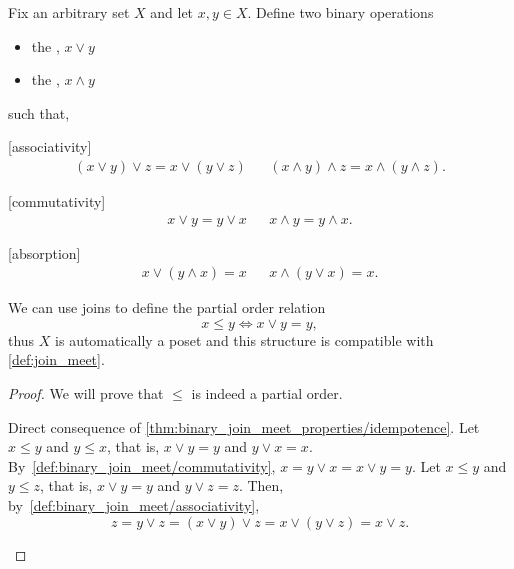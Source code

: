 \begin{definition}\label{def:binary_join_meet}
  Fix an arbitrary set \( X \) and let \( x, y \in X \). Define two binary operations
  \begin{itemize}
    \item the , \( x \lor y \)
    \item the , \( x \land y \)
  \end{itemize}
  such that,
  \begin{description}
    [associativity]
    \begin{align*}
      (x \lor y) \lor z = x \lor (y \lor z)
      &&
      (x \land y) \land z = x \land (y \land z).
    \end{align*}

    [commutativity]
    \begin{align*}
      x \lor y = y \lor x
      &&
      x \land y = y \land x.
    \end{align*}

    [absorption]
    \begin{align*}
      x \lor (y \land x) = x
      &&
      x \land (y \lor x) = x.
    \end{align*}
  \end{description}

  We can use joins to define the partial order relation
  \begin{equation*}
    x \leq y \iff x \lor y = y,
  \end{equation*}
  thus \( X \) is automatically a poset and this structure is compatible with \cref{def:join_meet}.
\end{definition}
\begin{proof}
  We will prove that \( \leq \) is indeed a partial order.
  \begin{description}
     Direct consequence of \cref{thm:binary_join_meet_properties/idempotence}.
     Let \( x \leq y \) and \( y \leq x \), that is, \( x \lor y = y \) and \( y \lor x = x \). By~\ref{def:binary_join_meet/commutativity}, \( x = y \lor x = x \lor y = y \).
     Let \( x \leq y \) and \( y \leq z \), that is, \( x \lor y = y \) and \( y \lor z = z \). Then, by~\ref{def:binary_join_meet/associativity},
    \begin{equation*}
      z = y \lor z = (x \lor y) \lor z = x \lor (y \lor z) = x \lor z.
    \end{equation*}
  \end{description}
\end{proof}

